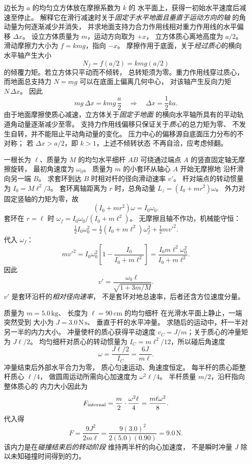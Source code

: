 
边长为 $a$ 的均匀立方体放在摩擦系数为 $k$ 的
水平面上，获得一初始水平速度后减速至停止。
解释它在滑行减速时关于\emph{固定于水平地面且垂直于运动方向的轴}
的角动量为何逐渐减少并消失，
并求地面支持力合力作用线相对重力作用线的水平偏移
$\Delta x$。
\exsolution
设立方体质量为 $m$，运动方向取为 $+x$，
立方体质心离地高度为 $a/2$。
滑动摩擦力大小为 $f=kmg$，指向 $-x$。
摩擦作用于底面，关于\emph{经过质心}的横向水平轴产生大小
\[
N_f=f(a/2)=kmg(a/2)
\]
的倾覆力矩。若立方体只平动而不倾转，
总转矩须为零。重力作用线穿过质心，
而地面总支持力 $N=mg$ 可以在底面上偏离几何中心，
对该轴产生反向力矩 $N\,\Delta x$。
因此
\[
mg\,\Delta x=kmg\,\frac a2
\quad\Longrightarrow\quad
\boxed{\Delta x=\frac12ka}.
\]
由于地面摩擦使质心减速，立方体关于\emph{固定于地面}
的横向水平轴所具有的平动轨道角动量逐渐减少至零。
支持力作用线偏移只保证关于\emph{质心}的总力矩为零、
不发生自转，并不能阻止平动角动量的变化。
\excheck 压力中心的偏移源自底面压力分布的不对称；
若 $\Delta x>a/2$，即 $k>1$，上述不倾转状态
不再自洽，应考虑倾翻。

一根长为 $\ell$、质量为 $M$ 的均匀水平细杆 $AB$
可绕通过端点 $A$ 的竖直固定轴无摩擦旋转，
最初角速度为 $\omega_0$。
质量为 $m$ 的小套环从轴心 $A$ 开始无摩擦地
沿杆滑向另一端 $B$。
求套环到达 $B$ 时相对杆的径向滑动速率 $v'$。
\exsolution
杆对端点的转动惯量为
$I_0=M\ell^2/3$。
套环离轴距离为 $r$ 时，总角动量
$L_z=(I_0+mr^2)\omega$。
外力对固定竖轴的力矩为零，故
\[
(I_0+mr^2)\omega=I_0\omega_0.
\]
套环在 $r=\ell$ 时
$\omega_f=I_0\omega_0/(I_0+m\ell^2)$。
无摩擦且轴不作功，机械能守恒：
\[
\tfrac12I_0\omega_0^2
=\tfrac12(I_0+m\ell^2)\omega_f^2
+\tfrac12m{v'}^2.
\]
代入 $\omega_f$：
\[
m{v'}^2
=I_0\omega_0^2
\left[1-\frac{I_0}{I_0+m\ell^2}\right]
=\frac{I_0m\ell^2\omega_0^2}{I_0+m\ell^2}.
\]
因此
\[
\boxed{v'=\frac{\omega_0\ell}{\sqrt{1+3m/M}}}.
\]
\excheck $v'$ 是套环沿杆的\emph{相对径向速率}，
不是套环对地总速率，后者还含方位速度分量。

质量为 $m=5.0\,\mathrm{kg}$、
长度为 $\ell=90\,\mathrm{cm}$ 的均匀细杆
在光滑水平面上静止，一端突然受到
大小为 $J=3.0\,\mathrm{N\,s}$、
垂直于杆的水平冲量。
求随后的运动中，杆一半对另一半的内力大小。
\exsolution
冲量使杆的质心获得平动速度
$v_C=J/m$；关于质心的冲量矩为
$J\ell/2$。
均匀细杆对质心的转动惯量为
$I_C=m\ell^2/12$，所以碰后角速度
\[
\omega=\frac{J\ell/2}{I_C}
=\frac{6J}{m\ell}.
\]
冲量结束后外部水平合力为零，
质心匀速运动、角速度恒定。
每半杆的质心距整杆质心 $\ell/4$，
做圆周运动所需向心加速度为
$\omega^2\ell/4$。
半杆质量 $m/2$，沿杆指向整体质心的
内力大小因此为
\[
F_{\rm internal}=\frac m2\cdot\frac{\omega^2\ell}{4}
=\frac{m\ell\omega^2}{8}.
\]
代入得
\[
\boxed{F=\frac{9J^2}{2m\ell}
=\frac{9(3.0)^2}{2(5.0)(0.90)}
=9.0\,\mathrm N}.
\]
\excheck 该内力是在\emph{碰撞结束后的转动阶段}
维持两半杆的向心加速度，
不是瞬时冲量 $J$ 除以未知碰撞时间得到的力。

